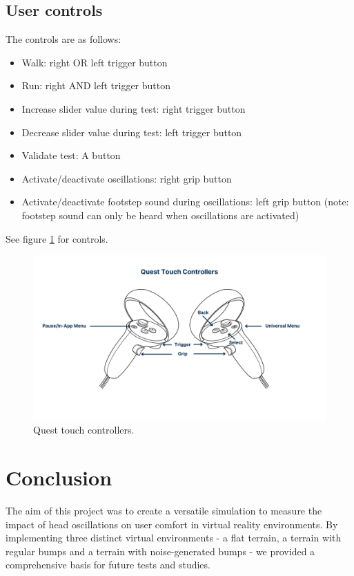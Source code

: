 \documentclass[american]{acmtog} %
\begin{document}
\subsection{User controls}
The controls are as follows:
\begin{itemize}[label=\textbullet]
    \item Walk: right OR left trigger button
    \item Run: right AND left trigger button
    \item Increase slider value during test: right trigger button
    \item Decrease slider value during test: left trigger button
    \item Validate test: A button
    \item Activate/deactivate oscillations: right grip button
    \item Activate/deactivate footstep sound during oscillations: left grip button (note: footstep sound can only be heard when oscillations are activated)
\end{itemize}
See figure \ref{fig:quest_controls} for controls.

\begin{figure}[H]
\centerline{\includegraphics[width=\columnwidth]{figures/quest_controls.png}}
\caption{Quest touch controllers.}
    \label{fig:quest_controls}
\end{figure}

\section{Conclusion}
\label{sec:conclusion}
The aim of this project was to create a versatile simulation to measure the impact of head oscillations on user comfort in virtual reality environments. By implementing three distinct virtual environments - a flat terrain, a terrain with regular bumps and a terrain with noise-generated bumps - we provided a comprehensive basis for future tests and studies.
\end{document}
